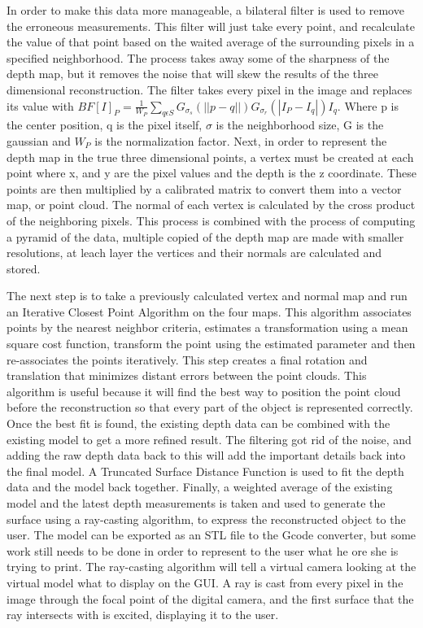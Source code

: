 \documentclass[12pt,twocolumn]{article}
\begin{document}
\indent In order to make this data more manageable, a bilateral filter is used to remove the erroneous measurements. This filter will just take every point, and recalculate the value of that point based on the waited average of the surrounding pixels in a specified neighborhood. The process takes away some of the sharpness of the depth map, but it removes the noise that will skew the results of the three dimensional reconstruction. The filter takes every pixel in the image and replaces its value with $BF[I]_{P} = \frac{1}{W_{P}}\sum_{q \epsilon S} G_{\sigma_{s}} (||p-q||)G_{\sigma_{r}} (|I_{P} - I_{q}|) I_{q}. $ Where  p is the center position, q is the pixel itself, ${\sigma}$ is the neighborhood size, G is the gaussian and $W_{P}$ is the normalization factor. Next, in order to represent the depth map in the true three dimensional points, a vertex must be created at each point where x, and y are the pixel values and the depth is the z coordinate. These points are then multiplied by a calibrated matrix to convert them into a vector map, or point cloud. The normal of each vertex is calculated by the cross product of the neighboring pixels. This process is combined with the process of computing a pyramid of the data, multiple copied of the depth map are made with smaller resolutions, at leach layer the vertices and their normals are calculated and stored. 

\indent The next step is to take a previously calculated vertex and normal map and run an Iterative Closest Point Algorithm on the four maps. This algorithm associates points by the nearest neighbor criteria, estimates a transformation using a mean square cost function, transform the point using the estimated parameter and then re-associates the points iteratively. This step creates a final rotation and translation that minimizes distant errors between the point clouds. This algorithm is useful because it will find the best way to position the point cloud before the reconstruction so that every part of the object is represented correctly. Once the best fit is found, the existing depth data can be combined with the existing model to get a more refined result. The filtering got rid of the noise, and adding the raw depth data back to this will add the important details back into the final model. A Truncated Surface Distance Function is used to fit the depth data and the model back together. Finally, a weighted average of the existing model and the latest depth measurements is taken and used to generate the surface using a ray-casting algorithm, to express the reconstructed object to the user. The model can be exported as an STL file to the Gcode converter, but some work still needs to be done in order to represent to the user what he ore she is trying to print. The ray-casting algorithm will tell a virtual camera looking at the virtual model what to display on the GUI. A ray is cast from every pixel in the image through the focal point of the digital camera, and the first surface that the ray intersects with is excited, displaying it to the user.  \cite{cite8}
\end{document}
